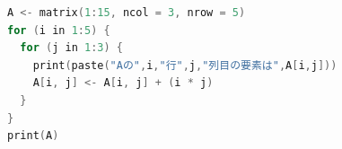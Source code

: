 \begin{lstlisting}[language=c++,label={code:16_32},caption={反復操作3}]
A <- matrix(1:15, ncol = 3, nrow = 5)
for (i in 1:5) {
  for (j in 1:3) {
    print(paste("Aの",i,"行",j,"列目の要素は",A[i,j]))
    A[i, j] <- A[i, j] + (i * j)
  }
}
print(A)
\end{lstlisting}
